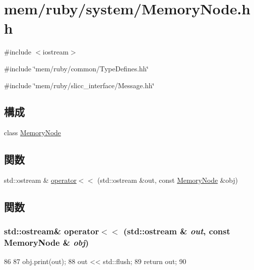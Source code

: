 \hypertarget{MemoryNode_8hh}{
\section{mem/ruby/system/MemoryNode.hh}
\label{MemoryNode_8hh}
}
{\ttfamily \#include $<$iostream$>$}\par
{\ttfamily \#include \char`\"{}mem/ruby/common/TypeDefines.hh\char`\"{}}\par
{\ttfamily \#include \char`\"{}mem/ruby/slicc\_\-interface/Message.hh\char`\"{}}\par
\subsection*{構成}
\begin{DoxyCompactItemize}
\item 
class \hyperlink{classMemoryNode}{MemoryNode}
\end{DoxyCompactItemize}
\subsection*{関数}
\begin{DoxyCompactItemize}
\item 
std::ostream \& \hyperlink{MemoryNode_8hh_ad3bd6ae0db70d4559d4664f0ed417f8a}{operator$<$$<$} (std::ostream \&out, const \hyperlink{classMemoryNode}{MemoryNode} \&obj)
\end{DoxyCompactItemize}


\subsection{関数}
\hypertarget{MemoryNode_8hh_ad3bd6ae0db70d4559d4664f0ed417f8a}{
\subsubsection[{operator$<$$<$}]{\setlength{\rightskip}{0pt plus 5cm}std::ostream\& operator$<$$<$ (std::ostream \& {\em out}, \/  const {\bf MemoryNode} \& {\em obj})}}
\label{MemoryNode_8hh_ad3bd6ae0db70d4559d4664f0ed417f8a}



\begin{DoxyCode}
86 {
87     obj.print(out);
88     out << std::flush;
89     return out;
90 }
\end{DoxyCode}
